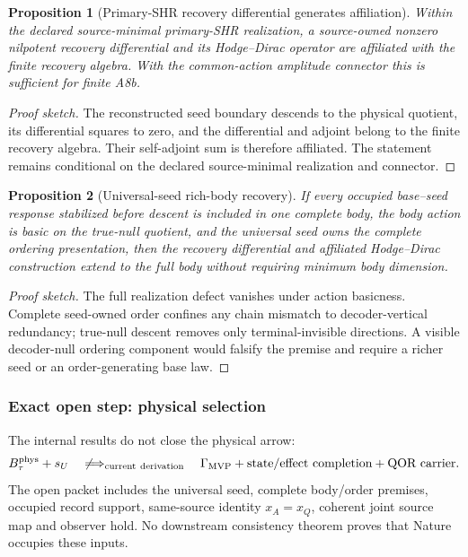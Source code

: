 \documentclass[11pt]{article}
\newtheorem{proposition}{Proposition}
\newcommand{\GMVP}{\Gamma_{\mathrm{MVP}}}
\begin{document}
\begin{proposition}[Primary-SHR recovery differential generates affiliation]
\label{prop:shr-recovery-differential-a8b}
Within the declared source-minimal primary-SHR realization, a source-owned
nonzero nilpotent recovery differential and its Hodge--Dirac operator are
affiliated with the finite recovery algebra.  With the common-action amplitude
connector this is sufficient for finite A8b.
\end{proposition}
\begin{proof}[Proof sketch]
The reconstructed seed boundary descends to the physical quotient, its
differential squares to zero, and the differential and adjoint belong to the
finite recovery algebra.  Their self-adjoint sum is therefore affiliated.
The statement remains conditional on the declared source-minimal realization
and connector.
\end{proof}

\begin{proposition}[Universal-seed rich-body recovery]
\label{prop:universal-seed-rich-body-recovery}
If every occupied base--seed response stabilized before descent is included in
one complete body, the body action is basic on the true-null quotient, and the
universal seed owns the complete ordering presentation, then the recovery
differential and affiliated Hodge--Dirac construction extend to the full body
without requiring minimum body dimension.
\end{proposition}
\begin{proof}[Proof sketch]
The full realization defect vanishes under action basicness.  Complete
seed-owned order confines any chain mismatch to decoder-vertical redundancy;
true-null descent removes only terminal-invisible directions.  A visible
decoder-null ordering component would falsify the premise and require a richer
seed or an order-generating base law.
\end{proof}

\subsubsection{Exact open step: physical selection}

The internal results do not close the physical arrow:
\begin{equation}
 B_\tau^{\rm phys}+s_U
 \quad\not\Longrightarrow_{\rm current\ derivation}\quad
 \GMVP+\text{state/effect completion}+\text{QOR carrier}.
 \label{eq:mvp-nonselection}
\end{equation}
The open packet includes the universal seed, complete body/order premises,
occupied record support, same-source identity \(x_A=x_Q\), coherent joint
source map and observer hold.  No downstream consistency theorem proves that
Nature occupies these inputs.
\end{document}
